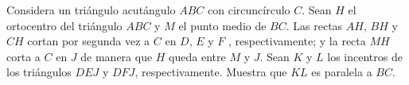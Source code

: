 Considera un triángulo acutángulo $ABC$ con circuncírculo $C$. Sean $H$ el ortocentro del
triángulo $ABC$ y $M$ el punto medio de $BC$. Las rectas $AH$, $BH$ y $CH$ cortan por
segunda vez a $C$ en $D$, $E$ y $F$ , respectivamente; y la recta $MH$ corta a $C$ en $J$ de manera
que $H$ queda entre $M$ y $J$. Sean $K$ y $L$ los incentros de los triángulos $DEJ$ y $DFJ$,
respectivamente. Muestra que $KL$ es paralela a $BC$.